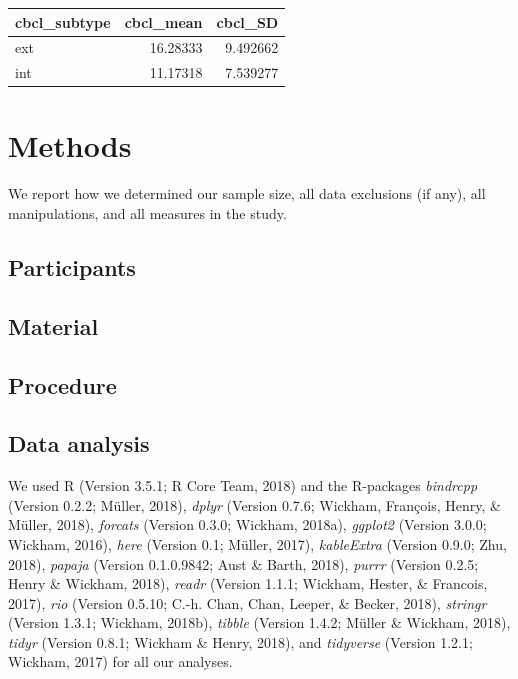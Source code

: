 \documentclass[man]{apa6}
\begin{document}
\begin{tabular}{lrr}
\toprule
cbcl\_subtype & cbcl\_mean & cbcl\_SD\\
\midrule
ext & 16.28333 & 9.492662\\
int & 11.17318 & 7.539277\\
\bottomrule
\end{tabular}

\section{Methods}\label{methods}

We report how we determined our sample size, all data exclusions (if
any), all manipulations, and all measures in the study.

\subsection{Participants}\label{participants}

\subsection{Material}\label{material}

\subsection{Procedure}\label{procedure}

\subsection{Data analysis}\label{data-analysis}

We used R (Version 3.5.1; R Core Team, 2018) and the R-packages
\emph{bindrcpp} (Version 0.2.2; Müller, 2018), \emph{dplyr} (Version
0.7.6; Wickham, François, Henry, \& Müller, 2018), \emph{forcats}
(Version 0.3.0; Wickham, 2018a), \emph{ggplot2} (Version 3.0.0; Wickham,
2016), \emph{here} (Version 0.1; Müller, 2017), \emph{kableExtra}
(Version 0.9.0; Zhu, 2018), \emph{papaja} (Version 0.1.0.9842; Aust \&
Barth, 2018), \emph{purrr} (Version 0.2.5; Henry \& Wickham, 2018),
\emph{readr} (Version 1.1.1; Wickham, Hester, \& Francois, 2017),
\emph{rio} (Version 0.5.10; C.-h. Chan, Chan, Leeper, \& Becker, 2018),
\emph{stringr} (Version 1.3.1; Wickham, 2018b), \emph{tibble} (Version
1.4.2; Müller \& Wickham, 2018), \emph{tidyr} (Version 0.8.1; Wickham \&
Henry, 2018), and \emph{tidyverse} (Version 1.2.1; Wickham, 2017) for
all our analyses.
\end{document}
